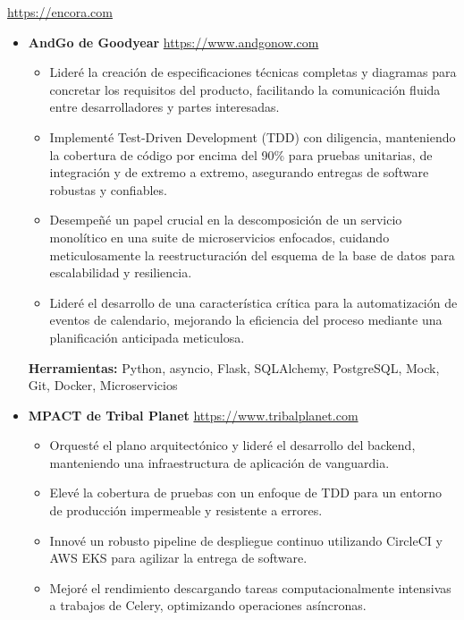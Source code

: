 \documentclass[11pt,a4paper,english]{moderncv}
\begin{document}
{
    \url{https://encora.com}
\newline{}
\begin{itemize}
    \item \textbf{AndGo de Goodyear}
        \newline{}
        \url{https://www.andgonow.com}
        \begin{itemize}
            \item Lideré la creación de especificaciones técnicas completas y diagramas para concretar los requisitos del producto, facilitando la comunicación fluida entre desarrolladores y partes interesadas.
            \item Implementé Test-Driven Development (TDD) con diligencia, manteniendo la cobertura de código por encima del 90\% para pruebas unitarias, de integración y de extremo a extremo, asegurando entregas de software robustas y confiables.
            \item Desempeñé un papel crucial en la descomposición de un servicio monolítico en una suite de microservicios enfocados, cuidando meticulosamente la reestructuración del esquema de la base de datos para escalabilidad y resiliencia.
            \item Lideré el desarrollo de una característica crítica para la automatización de eventos de calendario, mejorando la eficiencia del proceso mediante una planificación anticipada meticulosa.
        \end{itemize}
        \textbf{Herramientas:} Python, asyncio, Flask, SQLAlchemy, PostgreSQL, Mock, Git, Docker, Microservicios
    \item \textbf{MPACT de Tribal Planet}
        \newline{}
        \url{https://www.tribalplanet.com}
        \begin{itemize}
            \item Orquesté el plano arquitectónico y lideré el desarrollo del backend, manteniendo una infraestructura de aplicación de vanguardia.
            \item Elevé la cobertura de pruebas con un enfoque de TDD para un entorno de producción impermeable y resistente a errores.
            \item Innové un robusto pipeline de despliegue continuo utilizando CircleCI y AWS EKS para agilizar la entrega de software.
            \item Mejoré el rendimiento descargando tareas computacionalmente intensivas a trabajos de Celery, optimizando operaciones asíncronas.

\end{itemize}
\end{itemize}}
\end{document}
